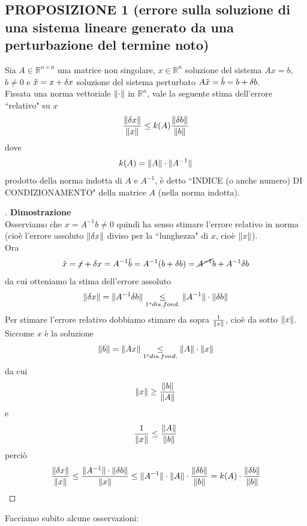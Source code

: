 \documentclass[12pt,a4paper]{article}
\DeclarePairedDelimiter{\norma}{\lVert}{\rVert}
\begin{document}
\subsection{PROPOSIZIONE 1 (errore sulla soluzione di una sistema lineare generato da una perturbazione del termine noto)}
Sia $A \in \mathbb{R}^{n\times n}$ una matrice non singolare, $x \in \mathbb{R}^n$ soluzione del sistema $Ax=b$, $b \neq 0$ e $\Tilde{x}=x+\delta x$ soluzione del sistema perturbato $A\Tilde{x}=\Tilde{b}=b+\delta b$.\\
Fissata una norma vettoriale $\norma{\cdot}$ in $\mathbb{R}^n$, vale la seguente stima dell'errore ``relativo" su $x$
\begin{equation*}
    \frac{\norma{\delta x}}{\norma{x}} \leq k(A) \frac{\norma{\delta b}}{\norma{b}}
\end{equation*}
dove 
\begin{equation*}
    k(A)=\norma{A}\cdot\norma{A^{-1}}
\end{equation*}
prodotto della norma indotta di $A$ e $A^{-1}$, è detto ``INDICE (o anche numero) DI CONDIZIONAMENTO" della matrice $A$ (nella norma indotta).\\
\begin{proof}[\unskip\nopunct]
\textbf{Dimostrazione}\\Osserviamo che $x=A^{-1}b\neq0$ quindi ha senso stimare l'errore relativo in norma (cioè l'errore assoluto $\norma{\delta x}$ diviso per la ``lunghezza" di $x$, cioè $\norma{x}$). \\Ora
\begin{equation*}
    \tilde{x}=\cancel{x}+\delta x =A^{-1}\tilde{b}=A^{-1}(b+\delta b)=\cancel{A^{-1}}b+A^{-1}\delta b
\end{equation*}
da cui otteniamo la stima dell'errore assoluto
\begin{equation*}
    \norma{\delta x}=\norma{A^{-1}\delta b}\underset{1^o dis. fond.}{\leq}\norma{A^{-1}}\cdot\norma{\delta b}
\end{equation*}
Per stimare l'errore relativo dobbiamo stimare da sopra $\frac{1}{\norma{x}}$, cioè da sotto $\norma{x}$.\\Siccome $x$ è la soluzione 
\begin{equation*}
    \norma{b}=\norma{Ax}\underset{1^o dis. fond.}{\leq}\norma{A}\cdot\norma{x}
\end{equation*}
da cui
\begin{equation*}
    \norma{x}\geq\frac{\norma{b}}{\norma{A}}
\end{equation*}
e
\begin{equation*}
    \frac{1}{\norma{x}} \le \frac{\norma{A}}{\norma{b}}
\end{equation*}
perciò
\begin{equation*}
    \frac{\norma{\delta x}}{\norma{x}}\leq \frac{\norma{A^{-1}}\cdot\norma{\delta b}}{\norma{x}}\leq \norma{A^{-1}}\cdot\norma{A}\cdot\frac{\norma{\delta b}}{\norma{b}}=k(A)\cdot\frac{\norma{\delta b}}{\norma{b}}
\end{equation*}
\end{proof}
Facciamo subito alcune osservazioni:
\end{document}
